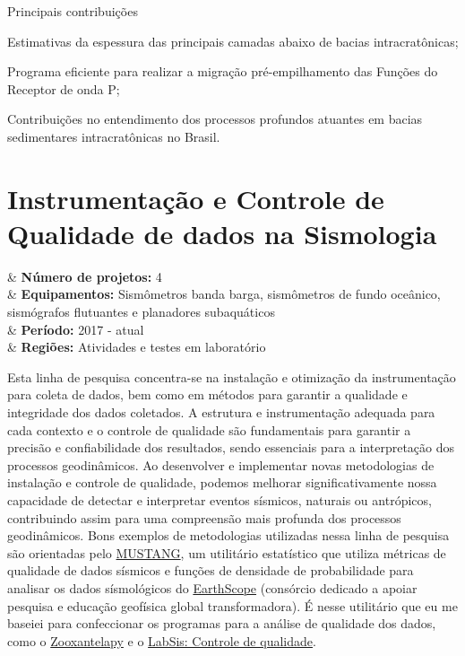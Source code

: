 \documentclass[10pt,a4paper,oneside]{book}
\begin{document}
\begin{fancyenum}{\faCogs}{Principais contribuições}
	\item Estimativas da espessura das principais camadas abaixo de bacias intracratônicas;
	\item Programa eficiente para realizar a migração pré-empilhamento das Funções do Receptor de onda P;
	\item Contribuições no entendimento dos processos profundos atuantes em bacias sedimentares intracratônicas no Brasil.
\end{fancyenum}

\section{Instrumentação e Controle de Qualidade de dados na Sismologia}
\label{sec_inst_qc}

\begin{summarybox}[frametitle=\faProjectDiagram{}\quad Panorama da linha de pesquisa]
	\begin{datelist}
		\faFile* & \textbf{Número de projetos:} 4 \\
		\faBinoculars & \textbf{Equipamentos:} Sismômetros banda barga, sismômetros de fundo oceânico, sismógrafos flutuantes e planadores subaquáticos \\
		\faCalendar*[regular] & \textbf{Período:} 2017 - atual \\
		\faMapMarked* & \textbf{Regiões:} Atividades e testes em laboratório \\
	\end{datelist}
\end{summarybox}

\bigskip

Esta linha de pesquisa concentra-se na instalação e otimização da instrumentação para coleta de dados, bem como em métodos para garantir a qualidade e integridade dos dados coletados. A estrutura e instrumentação adequada para cada contexto e o controle de qualidade são fundamentais para garantir a precisão e confiabilidade dos resultados, sendo essenciais para a interpretação dos processos geodinâmicos. Ao desenvolver e implementar novas metodologias de instalação e controle de qualidade, podemos melhorar significativamente nossa capacidade de detectar e interpretar eventos sísmicos, naturais ou antrópicos, contribuindo assim para uma compreensão mais profunda dos processos geodinâmicos. Bons exemplos de metodologias utilizadas nessa linha de pesquisa são orientadas pelo \href{https://services.iris.edu/mustang/}{MUSTANG}, um utilitário estatístico que utiliza métricas de qualidade de dados sísmicos e funções de densidade de probabilidade para analisar os dados sísmológicos do \href{https://www.earthscope.org/}{EarthScope} (consórcio dedicado a apoiar pesquisa e educação geofísica global transformadora). É nesse utilitário que eu me baseiei para confeccionar os programas para a análise de qualidade dos dados, como o \href{https://zooxantelapy.readthedocs.io/}{Zooxantelapy} e o \href{https://github.com/dIOGOLOC/codes_escritos/tree/master/LabSis_controle_de_qualidade}{LabSis: Controle de qualidade}.
\end{document}
